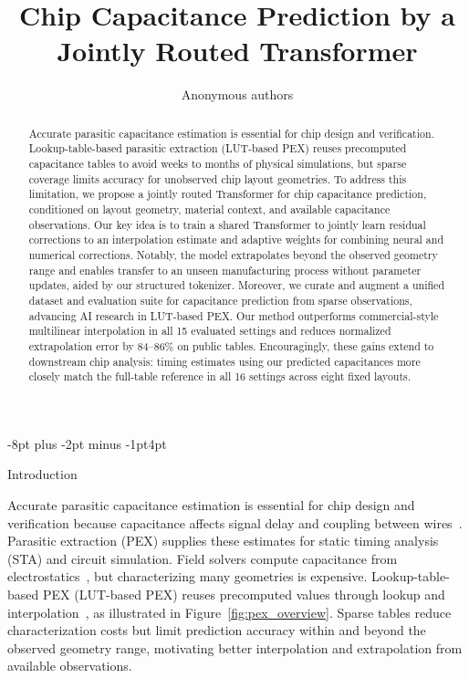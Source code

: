 \documentclass{article}
\title{Chip Capacitance Prediction by a Jointly Routed Transformer}
\author{Anonymous authors}
\makeatletter
\renewcommand{\section}{\@startsection{section}{1}{\z@}
  {-8pt plus -2pt minus -1pt}{4pt}{\large\sc\raggedright}}
\makeatother
\begin{document}
\maketitle


\begingroup
\renewcommand\thefootnote{}
\addtocounter{footnote}{-1}
\endgroup

\begin{abstract}
Accurate parasitic capacitance estimation is essential for chip design and verification.
Lookup-table-based parasitic extraction (LUT-based PEX) reuses precomputed capacitance tables to avoid weeks to months of physical simulations, but sparse coverage limits accuracy for unobserved chip layout geometries.
To address this limitation, we propose a jointly routed Transformer for chip capacitance prediction, conditioned on layout geometry, material context, and available capacitance observations.
Our key idea is to train a shared Transformer to jointly learn residual corrections to an interpolation estimate and adaptive weights for combining neural and numerical corrections.
Notably, the model extrapolates beyond the observed geometry range and enables transfer to an unseen manufacturing process without parameter updates, aided by our structured tokenizer.
Moreover, we curate and augment a unified dataset and evaluation suite for capacitance prediction from sparse observations, advancing AI research in LUT-based PEX.
Our method outperforms commercial-style multilinear interpolation in all 15 evaluated settings and reduces normalized extrapolation error by 84--86\% on public tables.
Encouragingly, these gains extend to downstream chip analysis: timing estimates using our predicted capacitances more closely match the full-table reference in all 16 settings across eight fixed layouts.
\end{abstract}

\section{Introduction}
\label{sec:introduction}

Accurate parasitic capacitance estimation is essential for chip design and
verification because capacitance affects signal delay and coupling between
wires~\citep{yu2021pex}.
Parasitic extraction (PEX) supplies these estimates for static timing analysis
(STA) and circuit simulation. Field solvers compute capacitance from
electrostatics~\citep{nabors1991fastcap}, but characterizing many geometries is
expensive. Lookup-table-based PEX (LUT-based PEX) reuses precomputed values through lookup and
interpolation~\citep{openrcx}, as illustrated in Figure~\ref{fig:pex_overview}.
Sparse tables reduce characterization costs but limit prediction accuracy
within and beyond the observed geometry range, motivating better interpolation
and extrapolation from available observations.
\end{document}
